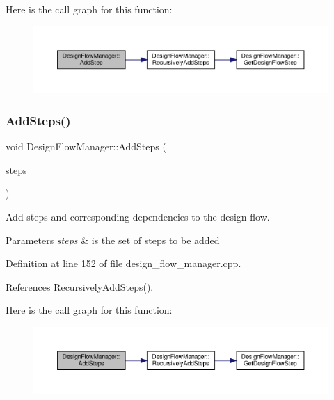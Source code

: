 Here is the call graph for this function\+:
\nopagebreak
\begin{figure}[H]
\begin{center}
\leavevmode
\includegraphics[width=350pt]{de/d63/classDesignFlowManager_ae694a3d971e944cd6349ef7c3dd0eff7_cgraph}
\end{center}
\end{figure}
\mbox{\label{classDesignFlowManager_a4ee7e2fb3a5313538b8ec26a49c498bd}} 
\subsubsection{\texorpdfstring{Add\+Steps()}{AddSteps()}}
{\footnotesize\ttfamily void Design\+Flow\+Manager\+::\+Add\+Steps (\begin{DoxyParamCaption}\item[{const \hyperlink{classDesignFlowStepSet}{Design\+Flow\+Step\+Set} \&}]{steps }\end{DoxyParamCaption})}



Add steps and corresponding dependencies to the design flow. 


\begin{DoxyParams}{Parameters}
{\em steps} & is the set of steps to be added \\
\hline
\end{DoxyParams}


Definition at line 152 of file design\+\_\+flow\+\_\+manager.\+cpp.



References Recursively\+Add\+Steps().

Here is the call graph for this function\+:
\nopagebreak
\begin{figure}[H]
\begin{center}
\leavevmode
\includegraphics[width=350pt]{de/d63/classDesignFlowManager_a4ee7e2fb3a5313538b8ec26a49c498bd_cgraph}
\end{center}
\end{figure}
\mbox{\label{classDesignFlowManager_aaac5aac231b91e51a8d63b611b3acba6}} 
